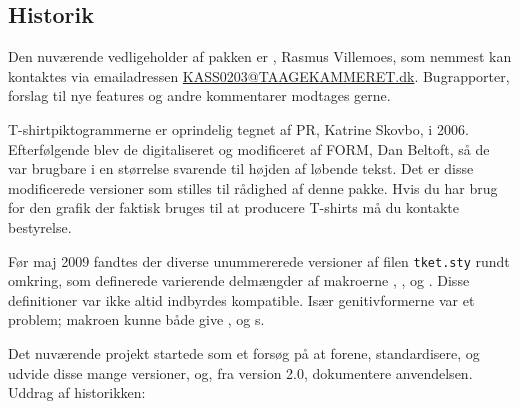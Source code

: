 \documentclass[a4paper,article,oneside]{memoir}
\newcommand{\emaillink}[1]{\href{mailto:#1}{#1}}
\newcommand{\filnavn}[1]{\texttt{#1}}
\begin{document}
\subsection{Historik}
\label{sec:historik}

Den nuværende vedligeholder af pakken er \KASS, Rasmus
Villemoes, som nemmest kan kontaktes via emailadressen
\emaillink{KASS0203@TAAGEKAMMERET.dk}. Bugrapporter, forslag til nye
features og andre kommentarer modtages gerne.

T-shirtpiktogrammerne er oprindelig tegnet af PR,
Katrine Skovbo, i 2006. Efterfølgende blev de digitaliseret og
modificeret af FORM, Dan Beltoft, så de var brugbare i
en størrelse svarende til højden af løbende tekst. Det er disse
modificerede versioner som stilles til rådighed af denne pakke. Hvis
du har brug for den grafik der faktisk bruges til at producere
T-shirts må du kontakte \TKETs bestyrelse.

Før maj 2009 fandtes der diverse unummererede versioner af filen
\filnavn{tket.sty} rundt omkring, som definerede varierende delmængder
af makroerne , ,  og . Disse
definitioner var ikke altid indbyrdes kompatible. Især genitivformerne
var et problem; makroen  kunne både give \TKETS, \TKETs og
\TKET{}s.

Det nuværende projekt startede som et forsøg på at forene,
standardisere, og udvide disse mange versioner, og, fra version 2.0,
dokumentere anvendelsen. Uddrag af historikken:
\end{document}
